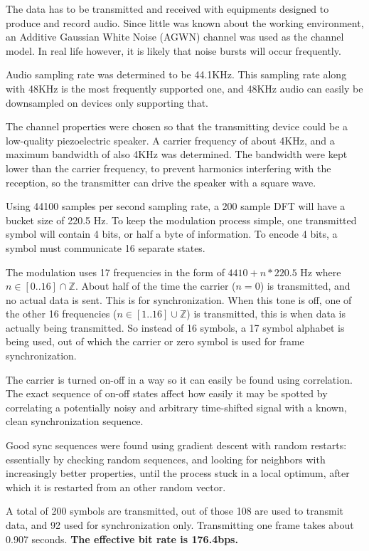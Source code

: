 \documentclass[a4paper]{article}
\begin{document}
The data has to be transmitted and received with equipments designed to
produce and record audio. Since little was known about the working
environment, an Additive Gaussian White Noise (AGWN) channel was used
as the channel model. In real life however, it is likely that noise
bursts will occur frequently.

Audio sampling rate was determined to be 44.1KHz. This sampling rate 
along with 48KHz is the most frequently supported one, and 48KHz audio 
can easily be downsampled on devices only supporting that.

The channel properties were chosen so that the transmitting device 
could be a low-quality piezoelectric speaker. A carrier frequency of 
about 4KHz, and a maximum bandwidth of also 4KHz was determined. The 
bandwidth were kept lower than the carrier frequency, to prevent 
harmonics interfering with the reception, so the transmitter can drive 
the speaker with a square wave.

Using 44100 samples per second sampling rate, a 200 sample DFT will have
a bucket size of 220.5 Hz. To keep the modulation process simple, one
transmitted symbol will contain 4 bits, or half a byte of information.
To encode 4 bits, a symbol must communicate 16 separate states.

The modulation uses 17 frequencies in the form of $4410 + n*220.5$ Hz
where $n \in [0..16] \cap \mathbb{Z}$. About half of the time the
carrier ($n=0$) is transmitted, and no actual data is sent. This is for
synchronization. When this tone is off, one of the other 16 frequencies
($n \in [1..16] \cup \mathbb{Z}$) is transmitted, this is when data is
actually being transmitted. So instead of 16 symbols, a 17 symbol
alphabet is being used, out of which the carrier or zero symbol is used
for frame synchronization.

The carrier is turned on-off in a way so it can easily be found using 
correlation. The exact sequence of on-off states affect how easily it 
may be spotted by correlating a potentially noisy and arbitrary 
time-shifted signal with a known, clean synchronization sequence.

Good sync sequences were found using gradient descent with random 
restarts: essentially by checking random sequences, and looking for 
neighbors with increasingly better properties, until the process 
stuck in a local optimum, after which it is restarted from an other
random vector.

A total of 200 symbols are transmitted, out of those 108 are used to 
transmit data, and 92 used for synchronization only. Transmitting one 
frame takes about 0.907 seconds. \textbf{The effective bit rate is 
176.4bps.}
\end{document}

